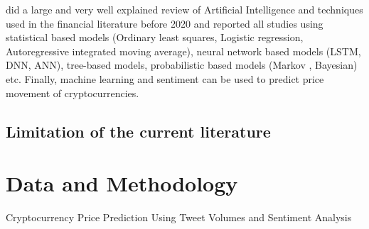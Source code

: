 \documentclass{article}
\begin{document}
	\cite{caaic} did a large and very well explained review of Artificial Intelligence and techniques used in the financial literature before 2020 and reported all studies using statistical based models (Ordinary least squares, Logistic regression, Autoregressive integrated moving average), neural network based models (LSTM, DNN, ANN), tree-based models, probabilistic based models (Markov \cite{pcpbu}, Bayesian) etc. Finally, machine learning and sentiment can be used to predict price movement of cryptocurrencies. 
	
	
	\subsection{Limitation of the current literature}
	\section{Data and Methodology}
	Cryptocurrency Price Prediction Using Tweet Volumes and Sentiment Analysis
	
	
	\newpage
	\printbibliography[heading=bibintoc]
	
\end{document}
